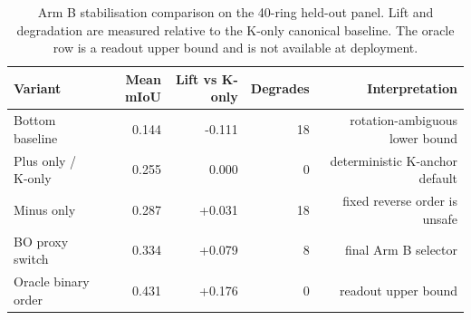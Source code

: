 \begin{table}[!t]
\caption{Arm B stabilisation comparison on the 40-ring held-out panel. Lift and degradation are measured relative to the K-only canonical baseline. The oracle row is a readout upper bound and is not available at deployment.}
\label{tab:arm-b-stabilisation}
\centering
\small
\begin{tabular}{lrrrr}
\toprule
Variant & Mean mIoU & Lift vs K-only & Degrades & Interpretation \\
\midrule
Bottom baseline & 0.144 & -0.111 & 18 & rotation-ambiguous lower bound \\
Plus only / K-only & 0.255 & 0.000 & 0 & deterministic K-anchor default \\
Minus only & 0.287 & +0.031 & 18 & fixed reverse order is unsafe \\
BO proxy switch & 0.334 & +0.079 & 8 & final Arm B selector \\
Oracle binary order & 0.431 & +0.176 & 0 & readout upper bound \\
\bottomrule
\end{tabular}
\end{table}

